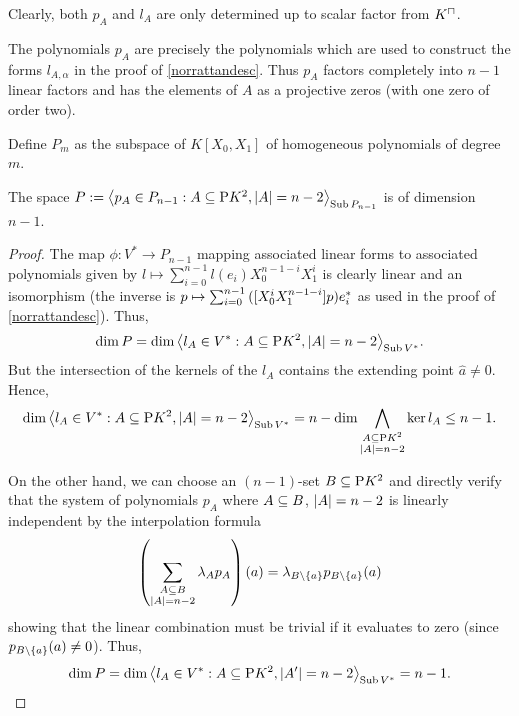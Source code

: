 \begin{remark}
    Clearly, both $p_A$ and $l_A$ are only determined up to scalar factor from $\units K$.
\end{remark}

\begin{remark}
    The polynomials $p_A$ are precisely the polynomials which are used to construct the forms $l_{A,\alpha}$ in the proof of \autoref{norrattandesc}. Thus $p_A$ factors completely into $n-1$ linear factors and has the elements of $A$ as a projective zeros (with one zero of order two).
\end{remark}

\begin{definition}
    Define $P_m$ as the subspace of $K[X_0,X_1]$ of homogeneous polynomials of degree $m$.
\end{definition}

\begin{lemma}
    The space $P:=\gen{p_A\in P_{n-1}:A\setleq \proj{K^2},\card A=n-2}_{\Sub P_{n-1}}$ is of dimension $n-1$.
\end{lemma}

\begin{proof}
    The map $\phi:V^{\ast}\to P_{n-1}$ mapping associated linear forms to associated polynomials given by $l\mapsto \sum_{i=0}^{n-1}{l(e_i)X_0^{n-1-i}X_1^i}$ is clearly linear and an isomorphism (the inverse is $p\mapsto\sum_{i=0}^{n-1}{([X_0^i X_1^{n-1-i}]p){e}^{\ast}_i}$ as used in the proof of \autoref{norrattandesc}). Thus,
    $$
\dim{P}=\dim\gen{l_A\in V^{\ast}:A\setleq \proj{K^2},\card A=n-2}_{\Sub\dual V}.
$$
But the intersection of the kernels of the $l_A$ contains the extending point $\hat{a}\neq 0$. Hence, 
$$
\dim\gen{l_A\in V^{\ast}:A\setleq \proj{K^2},\card A=n-2}_{\Sub \dual V}=n-\dim\Meet_{\substack{A\setleq\proj{K^2}\\ \card A=n-2}}{\ker{l_A}}\leq n-1.
$$

On the other hand, we can choose an $(n-1)$-set $B\subseteq \mathrm{P}{K^2}$ and directly verify that the system of polynomials $p_A$ where $A\subseteq B$, $\left\vert{A}\right\vert=n-2$ is linearly independent by the interpolation formula
$$
\left(\sum_{\substack{A\setleq B\\ \card{A}=n-2}}{\lambda_A p_A}\right)(a)=\lambda_{B\setminus\set{a}}p_{B\setminus\set{a}}(a)
$$
showing that the linear combination must be trivial if it evaluates to zero (since $p_{B\setminus\set{a}}(a)\neq 0$).
Thus,
$$
\dim{P}=\dim\gen{l_{A}\in V^{\ast}:A\setleq \proj{K^2},\card{A'}=n-2}_{\Sub \dual V}=n-1.
$$
\end{proof}

